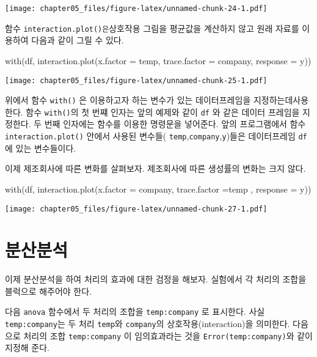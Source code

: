 \documentclass[
]{book}
\makeatletter
\newenvironment{Shaded}{\begin{snugshade}}{\end{snugshade}}
\newcommand{\AttributeTok}[1]{\textcolor[rgb]{0.77,0.63,0.00}{#1}}
\newcommand{\FunctionTok}[1]{\textcolor[rgb]{0.00,0.00,0.00}{#1}}
\newcommand{\NormalTok}[1]{#1}
\newenvironment{kframe}{%
\medskip{}
\setlength{\fboxsep}{.8em}
 \def\at@end@of@kframe{}%
 \ifinner\ifhmode%
  \def\at@end@of@kframe{\end{minipage}}%
  \begin{minipage}{\columnwidth}%
 \fi\fi%
 \def\FrameCommand##1{\hskip\@totalleftmargin \hskip-\fboxsep
 \colorbox{shadecolor}{##1}\hskip-\fboxsep
     \hskip-\linewidth \hskip-\@totalleftmargin \hskip\columnwidth}%
 \MakeFramed {\advance\hsize-\width
   \@totalleftmargin\z@ \linewidth\hsize
   \@setminipage}}%
 {\par\unskip\endMakeFramed%
 \at@end@of@kframe}
\newenvironment{rmdblock}[1]
  {
  \begin{itemize}
  \renewcommand{\labelitemi}{
    \raisebox{-.7\height}[0pt][0pt]{
      {\setkeys{Gin}{width=3em,keepaspectratio}\texttt{[image: images/\#1]}}
    }
  }
  \setlength{\fboxsep}{1em}
  \begin{kframe}
  \item
  }
  {
  \end{kframe}
  \end{itemize}
  }
\newenvironment{rmdnote}
  {\begin{rmdblock}{note}}
  {\end{rmdblock}}
\makeatother
\begin{document}
\texttt{[image: chapter05\_files/figure-latex/unnamed-chunk-24-1.pdf]}

함수 \texttt{interaction.plot()은}상호작용 그림을 평균값을 계산하지 않고 원래 자료를 이용하여 다음과 같이 그릴 수 있다.

\begin{Shaded}
\begin{Highlighting}[]
\FunctionTok{with}\NormalTok{(df, }\FunctionTok{interaction.plot}\NormalTok{(}\AttributeTok{x.factor =}\NormalTok{ temp, }\AttributeTok{trace.factor =}\NormalTok{ company,  }\AttributeTok{response =}\NormalTok{ y))}
\end{Highlighting}
\end{Shaded}

\texttt{[image: chapter05\_files/figure-latex/unnamed-chunk-25-1.pdf]}

\begin{rmdnote}
위에서 함수 \texttt{with()} 은 이용하고자 하는 변수가 있는 데이터프레임을 지정하는데사용한다.
함수 \texttt{with()}의 첫 번쨰 인자는 앞의 예제와 같이 \texttt{df} 와 같은 데이터 프레임을 지정한다.
두 번째 인자에는 함수를 이용한 명령문을 넣어준다. 앞의 프로그램에서 함수 \texttt{interaction.plot()}
안에서 사용된 변수들( \texttt{temp},\texttt{company},\texttt{y})들은 데이터프레임 \texttt{df}에 있는 변수들이다.
\end{rmdnote}

이제 제조회사에 따른 변화를 살펴보자. 제조회사에 따른 생성률의 변화는 크지 않다.

\begin{Shaded}
\begin{Highlighting}[]
\FunctionTok{with}\NormalTok{(df, }\FunctionTok{interaction.plot}\NormalTok{(}\AttributeTok{x.factor =}\NormalTok{ company, }\AttributeTok{trace.factor =}\NormalTok{temp ,  }\AttributeTok{response =}\NormalTok{ y))}
\end{Highlighting}
\end{Shaded}

\texttt{[image: chapter05\_files/figure-latex/unnamed-chunk-27-1.pdf]}

\hypertarget{uxbd84uxc0b0uxbd84uxc11d-2}{%
\section{분산분석}\label{uxbd84uxc0b0uxbd84uxc11d-2}}

이제 분산분석을 하여 처리의 효과에 대한 검정을 해보자. 실험에서 각 처리의 조합을
블럭으로 해주어야 한다.

다음 \texttt{anova} 함수에서 두 처리의 조합을 \texttt{temp:company} 로 표시한다. 사실 \texttt{temp:company}는 두 처리
\texttt{temp}와 \texttt{company}의 상호작용(interaction)을 의미한다. 다음으로 처리의 조합 \texttt{temp:company} 이
임의효과라는 것을 \texttt{Error(temp:company)}와 같이 지정해 준다.
\end{document}
